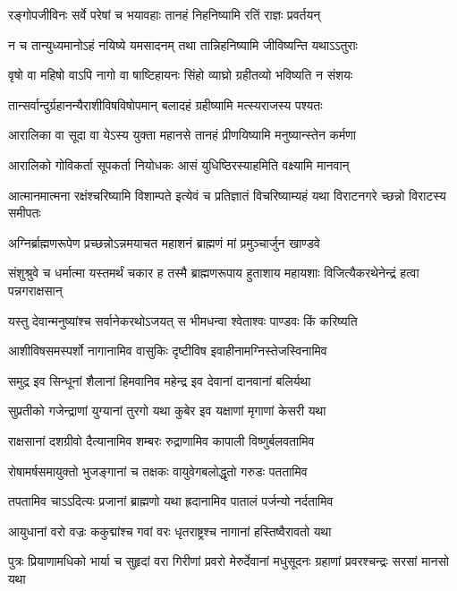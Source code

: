 \twolineshloka
{रङ्गोपजीविनः सर्वे परेषां च भयावहाः}
{तानहं निहनिष्यामि रतिं राज्ञः प्रवर्तयन्}


\twolineshloka
{न च तान्युध्यमानोऽहं नयिष्ये यमसादनम्}
{तथा तान्निहनिष्यामि जीविष्यन्ति यथाऽऽतुराः}


\twolineshloka
{वृषो वा महिषो वाऽपि नागो वा षाष्टिहायनः}
{सिंहो व्याघ्रो ग्रहीतव्यो भविष्यति न संशयः}


\twolineshloka
{तान्सर्वान्दुर्ग्रहानन्यैराशीविषविषोपमान्}
{बलादहं ग्रहीष्यामि मत्स्यराजस्य पश्यतः}


\twolineshloka
{आरालिका वा सूदा वा येऽस्य युक्ता महानसे}
{तानहं प्रीणयिष्यामि मनुष्यान्स्तेन कर्मणा}


\twolineshloka
{आरालिको गोविकर्ता सूपकर्ता नियोधकः}
{आसं युधिष्ठिरस्याहमिति वक्ष्यामि मानवान्}


\threelineshloka
{आत्मानमात्मना रक्षंश्चरिष्यामि विशाम्पते}
{इत्येवं च प्रतिज्ञातं विचरिष्याम्यहं यथा}
{विराटनगरे च्छन्नो विराटस्य समीपतः}




\twolineshloka
{अग्निर्ब्राह्मणरूपेण प्रच्छन्नोऽन्नमयाचत}
{महाशनं ब्राह्मणं मां प्रमुञ्चार्जुन खाण्डवे}


\threelineshloka
{संशुश्रुवे च धर्मात्मा यस्तमर्थं चकार ह}
{तस्मै ब्राह्मणरूपाय हुताशाय महायशाः}
{विजित्यैकरथेनेन्द्रं हत्वा पन्नगराक्षसान्}


\twolineshloka
{यस्तु देवान्मनुष्यांश्च सर्वानेकरथोऽजयत्}
{स भीमधन्वा श्वेताश्वः पाण्डवः किं करिष्यति}


\twolineshloka
{आशीविषसमस्पर्शो नागानामिव वासुकिः}
{दृष्टीविष इवाहीनामग्निस्तेजस्विनामिव}


\twolineshloka
{समुद्र इव सिन्धूनां शैलानां हिमवानिव}
{महेन्द्र इव देवानां दानवानां बलिर्यथा}


\twolineshloka
{सुप्रतीको गजेन्द्राणां युग्यानां तुरगो यथा}
{कुबेर इव यक्षाणां मृगाणां केसरी यथा}


\twolineshloka
{राक्षसानां दशग्रीवो दैत्यानामिव शम्बरः}
{रुद्राणामिव कापाली विष्णुर्बलवतामिव}


\twolineshloka
{रोषामर्षसमायुक्तो भुजङ्गानां च तक्षकः}
{वायुवेगबलोद्धृतो गरुडः पततामिव}


\twolineshloka
{तपतामिव चाऽऽदित्यः प्रजानां ब्राह्मणो यथा}
{ह्रदानामिव पातालं पर्जन्यो नर्दतामिव}


\twolineshloka
{आयुधानां वरो वज्रः ककुद्मांश्च गवां वरः}
{धृतराष्ट्रश्च नागानां हस्तिष्वैरावतो यथा}


\threelineshloka
{पुत्रः प्रियाणामधिको भार्या च सुहृदां वरा}
{गिरीणां प्रवरो मेरुर्देवानां मधुसूदनः}
{ग्रहाणां प्रवरश्चन्द्रः सरसां मानसो यथा}


